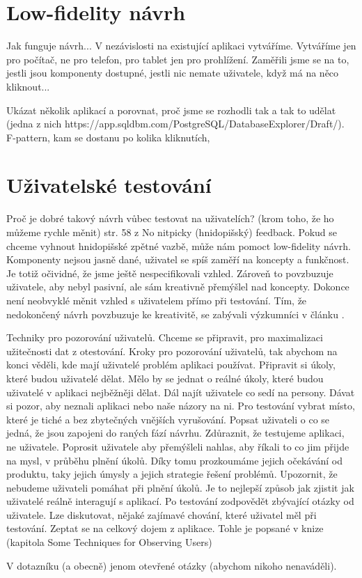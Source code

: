 \section{Low-fidelity návrh}

Jak funguje návrh... V nezávislosti na existující aplikaci vytváříme.
Vytváříme jen pro počítač, ne pro telefon, pro tablet jen pro prohlížení.
Zaměřili jsme se na to, jestli jsou komponenty dostupné, jestli nic nemate uživatele, když má na něco kliknout...


Ukázat několik aplikací a porovnat, proč jsme se rozhodli tak a tak to udělat (jedna z nich https://app.sqldbm.com/PostgreSQL/DatabaseExplorer/Draft/). F-pattern, kam se dostanu po kolika kliknutích, 

\section{Uživatelské testování}


Proč je dobré takový návrh vůbec testovat na uživatelích? (krom toho, že ho můžeme rychle měnit) str. 58 z \cite{Paper_Prototyping} No nitpicky (hnidopišský) feedback. Pokud se chceme vyhnout hnidopišské zpětné vazbě, může nám pomoct low-fidelity návrh. Komponenty nejsou jasně dané, uživatel se spíš zaměří na koncepty a funkčnost. Je totiž očividné, že jsme ještě nespecifikovali vzhled. Zároveň to povzbuzuje uživatele, aby nebyl pasivní, ale sám kreativně přemýšlel nad koncepty. Dokonce není neobvyklé měnit vzhled s uživatelem přímo při testování. Tím, že nedokončený návrh povzbuzuje ke kreativitě, se zabývali výzkumníci v článku \cite{Schumann_1996_AEN}.

Techniky pro pozorování uživatelů. Chceme se připravit, pro maximalizaci užitečnosti dat z otestování. Kroky pro pozorování uživatelů, tak abychom na konci věděli, kde mají uživatelé problém aplikaci používat. 
Připravit si úkoly, které budou uživatelé dělat. Mělo by se jednat o reálné úkoly, které budou uživatelé v aplikaci nejběžněji dělat. 
Dál najít uživatele co sedí na persony. Dávat si pozor, aby neznali aplikaci nebo naše názory na ni.
Pro testování vybrat místo, které je tiché a bez zbytečných vnějších vyrušování.
Popsat uživateli o co se jedná, že jsou zapojeni do raných fází návrhu. Zdůraznit, že testujeme aplikaci, ne uživatele.
Poprosit uživatele aby přemýšleli nahlas, aby říkali to co jim přijde na mysl, v průběhu plnění úkolů. Díky tomu prozkoumáme jejich očekávání od produktu, taky jejich úmysly a jejich strategie řešení problémů.
Upozornit, že nebudeme uživateli pomáhat při plnění úkolů. Je to nejlepší způsob jak zjistit jak uživatelé reálně interagují s aplikací. 
Po testování zodpovědět zbývající otázky od uživatele. Lze diskutovat, nějaké zajímavé chování, které uživatel měl při testování. Zeptat se na celkový dojem z aplikace. Tohle je popsané v knize \cite{Brenda_1990_art} (kapitola Some Techniques for Observing Users)

V dotazníku (a obecně) jenom otevřené otázky (abychom nikoho nenaváděli).


